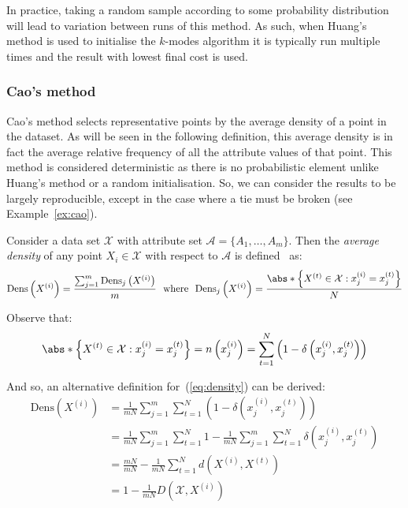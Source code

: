 In practice, taking a random sample according to some probability distribution
will lead to variation between runs of this method. As such, when Huang's method
is used to initialise the \(k\)-modes algorithm it is typically run multiple
times and the result with lowest final cost is used.

%

\subsubsection{Cao's method}\label{subsec:cao}

Cao's method selects representative points by the average density of a point in
the dataset. As will be seen in the following definition, this average density 
is in fact the average relative frequency of all the attribute values of that 
point. This method is considered deterministic as there is no probabilistic
element \- unlike Huang's method or a random initialisation. So, we can consider
the results to be largely reproducible, except in the case where a tie must be
broken (see Example~\ref{ex:cao}).

\begin{definition}\label{def:density}	
    Consider a data set \(\mathcal{X}\) with attribute set \(\mathcal{A} = 
    \{A_1, \ldots, A_m\}\). Then the \emph{average density} of any point 
    \(X_i \in \mathcal{X}\) with respect to \(\mathcal{A}\) is 
    defined~\cite{Cao2009} as:
    \begin{equation}\label{eq:density}
        \text{Dens}\left(X^{(i)}\right) = \frac{%
            \sum_{j=1}^m \text{Dens}_{j}\left(X^{(i)}\right)
        }{m}
        \ \ \text{where} \ \
        \text{Dens}_{j}\left(X^{(i)}\right) = \frac{%
            \abs*{%
                \left\{X^{(t)} \in \mathcal{X} : x_j^{(i)} = x_j^{(t)}\right\}
            }
        }{N}
    \end{equation}

    Observe that:
    \[
        \abs*{\left\{X^{(t)} \in \mathcal{X} : x_j^{(i)} = x_j^{(t)}\right\}}%
        = n\left(x_j^{(i)}\right)%
        = \sum_{t=1}^N \left(1 - \delta\left(x_j^{(i)}, x_j^{(t)}\right)\right)
    \]

    And so, an alternative definition for~(\ref{eq:density}) can be derived:
    \begin{equation}\label{eq:density-alt}
    \begin{aligned}
        \text{Dens}\left(X^{(i)}\right)
        & = \frac{1}{mN} \sum_{j=1}^m \sum_{t=1}^N \left(%
            1 - \delta\left(x_j^{(i)}, x_j^{(t)}\right)
        \right)\\
        & = \frac{1}{mN} \sum_{j=1}^m \sum_{t=1}^N 1%
            - \frac{1}{mN} \sum_{j=1}^m \sum_{t=1}^N
            \delta\left(x_j^{(i)}, x_j^{(t)}\right)\\
        & = \frac{mN}{mN} - \frac{1}{mN} \sum_{t=1}^N
            d\left(X^{(i)}, X^{(t)}\right)\\
        & = 1 - \frac{1}{mN} D\left(\mathcal{X}, X^{(i)}\right)
    \end{aligned}
    \end{equation}
\end{definition}

